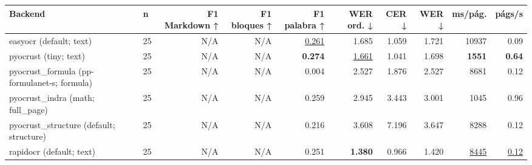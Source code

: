 \documentclass[varwidth,border=2pt]{standalone}
\begin{document}
\begin{tabular}{llrrrrrrrr}
\toprule
Backend & n & F1 Markdown ↑ & F1 bloques ↑ & F1 palabra ↑ & WER ord. ↓ & CER ↓ & WER ↓ & ms/pág. & págs/s \\
\midrule
easyocr (default; text) & 25 & N/A & N/A & \underline{0.261} & 1.685 & 1.059 & 1.721 & 10937 & 0.09 \\
pyocrust (tiny; text) & 25 & N/A & N/A & \textbf{0.274} & \underline{1.661} & 1.041 & 1.698 & \textbf{1551} & \textbf{0.64} \\
pyocrust\_formula (pp-formulanet-s; formula) & 25 & N/A & N/A & 0.004 & 2.527 & 1.876 & 2.527 & 8681 & 0.12 \\
pyocrust\_indra (math; full\_page) & 25 & N/A & N/A & 0.259 & 2.945 & 3.443 & 3.001 & 1045 & 0.96 \\
pyocrust\_structure (default; structure) & 25 & N/A & N/A & 0.216 & 3.608 & 7.196 & 3.647 & 8288 & 0.12 \\
rapidocr (default; text) & 25 & N/A & N/A & 0.251 & \textbf{1.380} & 0.966 & 1.420 & \underline{8445} & \underline{0.12} \\
\bottomrule
\end{tabular}
\end{document}
